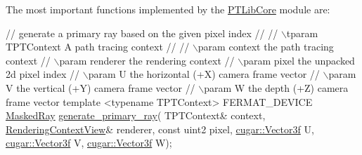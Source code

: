 \begin{DoxyParagraph}{}
The most important functions implemented by the \hyperlink{group___p_t_lib_core}{P\+T\+Lib\+Core} module are\+: ~\newline

\begin{DoxyCode}
\textcolor{comment}{// generate a primary ray based on the given pixel index}
\textcolor{comment}{//}
\textcolor{comment}{// \(\backslash\)tparam TPTContext             A path tracing context}
\textcolor{comment}{//}
\textcolor{comment}{// \(\backslash\)param context                  the path tracing context}
\textcolor{comment}{// \(\backslash\)param renderer                 the rendering context}
\textcolor{comment}{// \(\backslash\)param pixel                    the unpacked 2d pixel index}
\textcolor{comment}{// \(\backslash\)param U                        the horizontal (+X) camera frame vector}
\textcolor{comment}{// \(\backslash\)param V                        the vertical (+Y) camera frame vector}
\textcolor{comment}{// \(\backslash\)param W                        the depth (+Z) camera frame vector}
\textcolor{keyword}{template} <\textcolor{keyword}{typename} TPTContext>
FERMAT\_DEVICE
\hyperlink{struct_masked_ray}{MaskedRay} \hyperlink{group___p_t_lib_core_ga28fe33ab0663b2331fe607662ed07349}{generate\_primary\_ray}(
  TPTContext&             context,
  \hyperlink{struct_rendering_context_view}{RenderingContextView}&   renderer,
  \textcolor{keyword}{const} uint2             pixel,
  \hyperlink{structcugar_1_1_vector}{cugar::Vector3f}         U,
  \hyperlink{structcugar_1_1_vector}{cugar::Vector3f}         V,
  \hyperlink{structcugar_1_1_vector}{cugar::Vector3f}         W);


\end{DoxyCode}
\end{DoxyParagraph}
